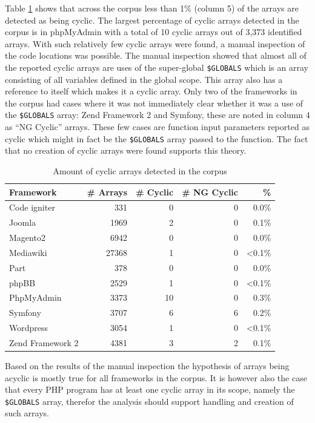 

Table \ref{tab:cyclic_arrays} shows that across the corpus less than 1\% (column 5) of the arrays are detected as being cyclic. The largest percentage of cyclic arrays detected in the corpus is in phpMyAdmin with a total of 10 cyclic arrays out of 3,373 identified arrays. With such relatively few cyclic arrays were found, a manual inspection of the code locations was possible. The manual inspection showed that almost all of the reported cyclic arrays are uses of the super-global \texttt{\$GLOBALS} which is an array consisting of all variables defined in the global scope. This array also has a reference to itself which makes it a cyclic array. Only two of the frameworks in the corpus had cases where it was not immediately clear whether it was a use of the \texttt{\$GLOBALS} array: Zend Framework 2 and Symfony, these are noted in column 4 as ``NG Cyclic'' arrays. These few cases are function input parameters reported as cyclic which might in fact be the \texttt{\$GLOBALS} array passed to the function. The fact that no creation of cyclic arrays were found supports this theory.

\begin{table}
\centering

\begin{tabular}{l| r  r  r  r}
Framework & \# Arrays & \# Cyclic & \# NG Cyclic & \%  \\ \hline \hline
Code igniter & 331 & 0 & 0 & 0.0\% \\
Joomla & 1969 & 2 & 0 & 0.1\% \\ 
Magento2 & 6942 & 0 & 0 & 0.0\%\\ 
Mediawiki & 27368 & 1 & 0 & <0.1\%\\ 
Part & 378 & 0 & 0 & 0.0\%\\ 
phpBB & 2529 & 1 & 0 & <0.1\%\\
PhpMyAdmin & 3373 & 10 & 0 & 0.3\%\\
Symfony & 3707 & 6 & 6 & 0.2\%\\ %
Wordpress & 3054 & 1 & 0 & <0.1\%\\ 
Zend Framework 2 & 4381 & 3 & 2 & 0.1\%
\end{tabular}

\caption{Amount of cyclic arrays detected in the corpus}
\label{tab:cyclic_arrays}
\end{table}

Based on the results of the manual inspection the hypothesis of arrays being acyclic is mostly true for all frameworks in the corpus. It is however also the case that every PHP program has at least one cyclic array in its scope, namely the \texttt{\$GLOBALS} array, therefor the analysis should support handling and creation of such arrays.

